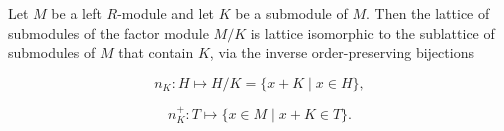 Let $M$ be a left $R$-module and let $K$ be a submodule of $M$. Then the lattice of submodules of the factor module $M/K$ is lattice isomorphic to the sublattice of submodules of $M$ that contain $K$, via the inverse order-preserving bijections

$$n_K: H \mapsto H/K = \{x + K \mid x \in H\},$$

$$n_K^+: T \mapsto \{x \in M \mid x + K \in T\}.$$
